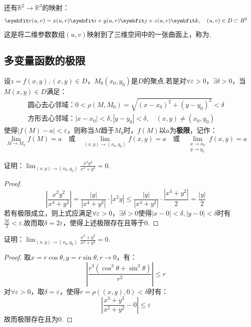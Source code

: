 还有$\mathbb{R}^2 \to \mathbb{R}^3$的映射：
\[\vb{r}(u,v) = x(u,v)\vb{i} + y(u,v)\vb{j} + z(u,v)\vb{k},\quad (u,v)\in D \subset \mathbb{R}^2\]
这是将二维参数数组$(u,v)$映射到了三维空间中的一张曲面上，称为.


\subsection{多变量函数的极限}
\begin{definition}
    设$z=f(x,y),(x,y)\in D$，$M_0(x_0,y_0)$是$D$的聚点.若是对$\forall \varepsilon > 0$，$\exists \delta > 0$，当$M(x,y)\in D$满足：
    \begin{gather*}
        \text{圆心去心邻域：}0 < \rho(M,M_0) = \sqrt{(x-x_0)^2 + (y-y_0)^2} < \delta\\
        \text{方形去心邻域：}|x-x_0|<\delta,|y-y_0|<\delta,\quad(x,y)\neq (x_0,y_0)
    \end{gather*}
    使得$|f(M)-a|<\varepsilon$，则称当$M$趋于$M_0$时，$f(M)$以$a$为\textbf{极限}，记作：
    \[\lim_{M \to M_0}f(M) = a \quad\text{或}\quad \lim_{(x,y)\to(x_0,y_0)}f(x,y) = a \quad\text{或}\quad \lim_{\substack{x \to x_0 \\ y \to y_0}}f(x,y) = a\]
\end{definition}

\begin{question}
    证明：$\displaystyle \lim_{(x,y)\to(x_0,y_0)}\frac{x^2y^2}{x^4+y^2} = 0$.
\end{question}

\begin{proof}
    \[\left|\frac{x^2y^2}{x^4+y^2}\right| = \frac{|y|}{|x^4+y^2|}\cdot|x^2 y| \leqslant \frac{|y|}{|x^4+y^2|}\cdot\frac{|x^4+y^2|}{2} = \frac{|y|}{2}\]
    若有极限成立，则上式应满足$\forall \varepsilon > 0$，$\exists\delta>0$使得$|x-0|<\delta,|y-0|<\delta$时有$\frac{|y|}{2} < \varepsilon$.故而取$\delta = 2\varepsilon$，使得上述极限存在且等于$0$.
\end{proof}

\begin{question}
    证明：$\displaystyle \lim_{(x,y)\to(x_0,y_0)}\frac{x^3+y^3}{x^2+y^2} = 0$.
\end{question}

\begin{proof}
    取$x = r\cos\theta, y = r\sin\theta, r \to 0$，有：
    \[\left|\frac{r^3(\cos^3\theta + \sin^3\theta)}{r^2}\right| \leqslant r\]
    对$\forall \varepsilon > 0$，取$\delta = \varepsilon$，使得$r = \rho((x,y),0) < \delta$时有：
    \[\left|\frac{x^3+y^3}{x^2+y^2} - 0\right| \leqslant \varepsilon\]
    故而极限存在且为$0$.
\end{proof}

